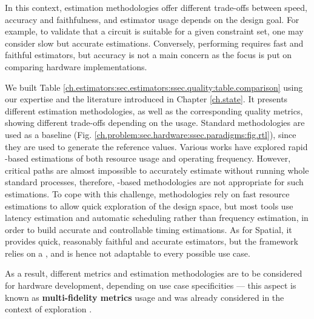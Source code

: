         In this context, estimation methodologies offer different trade-offs between speed, accuracy and faithfulness, and estimator usage depends on the design goal.
        For example, to validate that a circuit is suitable for a given constraint set, one may consider slow but accurate estimations.
        Conversely, performing  requires fast and faithful estimators, but accuracy is not a main concern as the focus is put on comparing hardware implementations.

        We built Table \ref{ch.estimators:sec.estimators:ssec.quality:table.comparison} using our expertise and the literature introduced in Chapter \ref{ch.state}.
        It presents different estimation methodologies, as well as the corresponding quality metrics, showing different trade-offs depending on the usage.
        Standard  methodologies are used as a baseline (Fig. \ref{ch.problem:sec.hardware:ssec.paradigms:fig.rtl}), since they are used to generate the reference values.
        Various works have explored rapid -based estimations of both resource usage and operating frequency.
        However, critical paths are almost impossible to accurately estimate without running whole standard processes, therefore, -based methodologies are not appropriate for such estimations.
        To cope with this challenge,  methodologies rely on fast resource estimations to allow quick exploration of the design space, but most tools use latency estimation and automatic scheduling rather than frequency estimation, in order to build accurate and controllable timing estimations.
        As for Spatial, it provides quick, reasonably faithful and accurate estimators, but the framework relies on a , and is hence not adaptable to every possible use case.

        As a result, different metrics and estimation methodologies are to be considered for hardware development, depending on use case specificities --- this aspect is known as {\bf multi-fidelity metrics} usage and was already considered in the context of  exploration \cite{lo_multi-fidelity_2018}.

